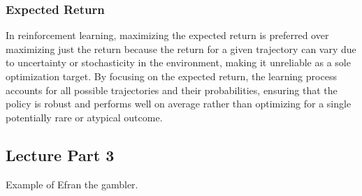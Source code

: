 \subsubsection{Expected Return}
\begin{warning}
    In reinforcement learning, maximizing the expected return is preferred over maximizing just the return because the return for a given trajectory can vary due to uncertainty or stochasticity in the environment, making it unreliable as a sole optimization target. By focusing on the expected return, the learning process accounts for all possible trajectories and their probabilities, ensuring that the policy is robust and performs well on average rather than optimizing for a single potentially rare or atypical outcome.
\end{warning}

\subsection{Lecture Part 3}
\begin{example}
    Example of Efran the gambler. 
\end{example}

